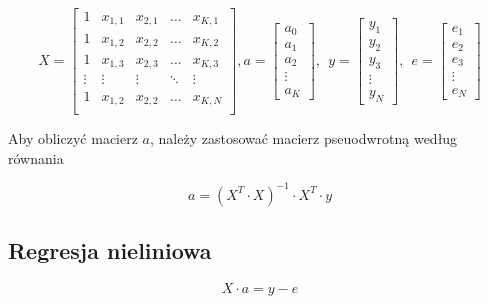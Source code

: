 \begin{equation*}
    X = \begin{bmatrix}
            1 & x_{1,1} & x_{2,1} &\hdots& x_{K,1}\\
            1 & x_{1,2} & x_{2,2} &\hdots& x_{K,2}\\
            1 & x_{1,3} & x_{2,3} &\hdots& x_{K,3}\\
            \vdots & \vdots & \vdots & \ddots & \vdots\\
            1 & x_{1,2} & x_{2,2} &\hdots& x_{K,N}\\
    \end{bmatrix}, 
a = \begin{bmatrix}
    a_0 \\ a_1 \\ a_2 \\ \vdots \\a_K
\end{bmatrix},\ \
y = \begin{bmatrix}
    y_1 \\ y_2 \\ y_3 \\ \vdots \\ y_N
\end{bmatrix},\ \
e = \begin{bmatrix}
    e_1\\e_2\\e_3\\\vdots\\e_N
\end{bmatrix}
\end{equation*}

Aby obliczyć macierz $a$, należy zastosować macierz pseuodwrotną
według równania

\begin{equation*}
a = ( X^T \cdot X)^{-1} \cdot X^T \cdot y
\end{equation*}

\subsection*{Regresja nieliniowa}

\begin{equation*}
    X \cdot a = y - e
\end{equation*}

